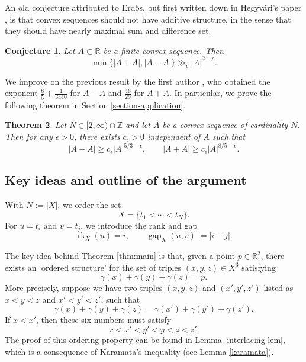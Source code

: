 \documentclass{amsart}
\numberwithin{equation}{section}
\newtheorem{theorem}{Theorem}[section]
\newtheorem{conjecture}[theorem]{Conjecture}
\newcommand{\e}{\epsilon}
\newcommand{\ZR}{\mathbb{R}}
\newcommand{\ZZ}{\mathbb{Z}}
\newcommand{\gap}{\operatorname{gap}}
\begin{document}
An old conjecture attributed to Erd\H{o}s, but first written down in Hegyv\'ari's paper \cite{Heg86}, is that convex sequences should not have additive structure, in the sense that they should have nearly maximal sum and difference set.

\begin{conjecture}
    Let \(A \subset \mathbb{R}\) be a finite convex sequence. Then
    \[
    \min\{|A+A|, |A-A|\} \gg_{\e} |A|^{2 - \e}
    .\]
\end{conjecture}

We improve on the previous result by the first author \cite{Cushman-sumproduct}, who obtained the exponent $\frac{8}{5}+\frac{1}{3440}$ for $A-A$ and $\frac{46}{29}$ for $A+A$. In particular, we prove the following theorem in Section \ref{section-application}.

\begin{theorem}
    \label{difference-set-thm}
    Let $N\in[2,\infty)\cap \ZZ$ and let $A$ be a convex sequence of cardinality $N$.
    Then for any $\e>0$, there exists $c_\e>0$ independent of $A$ such that
    \begin{equation}
        \label{difference-set}
        |A-A|\geq c_\e|A|^{5/3-\e}, \qquad |A+A|\geq c_\e|A|^{8/5-\e}.
    \end{equation}
    
\end{theorem}




\bigskip  

\subsection{Key ideas and outline of the argument}
\label{outline-subsection}

With $N:=|X|$, we order the set
\[
X=\{t_1<\cdots<t_N\}.
\]
For $u=t_i$ and $v=t_j$, we introduce the rank and gap
\[
\operatorname{rk}_X(u)=i,\qquad \gap_X(u,v):=|i-j|.
\]

\smallskip 

The key idea behind Theorem \ref{thm:main} is that, given a point $p\in\ZR^2$, there exists an `ordered structure' for the set of triples $(x,y,z)\in X^3$ satisfying
\begin{equation}
    \nonumber
    \gamma(x)+\gamma(y)+\gamma(z)=p.
\end{equation}
More precisely, suppose we have two triples $(x,y,z)$ and $(x',y',z')$ listed as $x<y<z$ and $x'<y'<z'$, such that 
\begin{equation}
    \label{six-tuples}
    \gamma(x)+\gamma(y)+\gamma(z)=\gamma(x')+\gamma(y')+\gamma(z').
\end{equation}
If $x<x'$, then these six numbers must satisfy
\begin{equation}
    \label{order}
    x<x'<y'<y<z<z'.
\end{equation}
The proof of this ordering property can be found in Lemma \ref{interlacing-lem}, which is a consequence of Karamata's inequality (see Lemma \ref{karamata}). 
\end{document}
